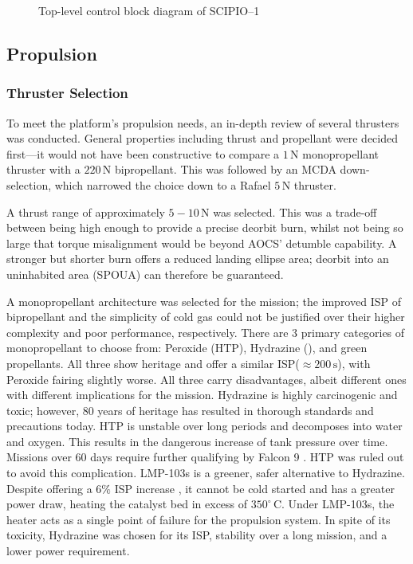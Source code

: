 \documentclass[a4paper, 11pt, conference]{IEEEtran}
\begin{document}
\begin{figure}[H]
    \centering
    \resizebox{0.9\linewidth}{!}{%
    }
    \caption{Top-level control block diagram of SCIPIO–1}
    \label{fig:controlblock}
\end{figure}

\subsection{Propulsion}
\subsubsection{Thruster Selection}
To meet the platform's propulsion needs, an in-depth review of several thrusters was conducted. General properties including thrust and propellant were decided first—it would not have been constructive to compare a $1\,\mathrm{N}$ monopropellant thruster with a $220\,\mathrm{N}$ bipropellant. This was followed by an MCDA down-selection, which narrowed the choice down to a Rafael $5\,\mathrm{N}$ thruster.

A thrust range of approximately $5-10\,\mathrm{N}$ was selected. This was a trade-off between being high enough to provide a precise deorbit burn, whilst not being so large that torque misalignment would be beyond AOCS’ detumble capability. A stronger but shorter burn offers a reduced landing ellipse area; deorbit into an uninhabited area (SPOUA) can therefore be guaranteed.

A monopropellant architecture was selected for the mission; the improved ISP of bipropellant and the simplicity of cold gas could not be justified over their higher complexity and poor performance, respectively. There are 3 primary categories of monopropellant to choose from: Peroxide (HTP), Hydrazine (), and green propellants. All three show heritage and offer a similar ISP($\approx200\,\mathrm{s}$), with Peroxide fairing slightly worse. All three carry disadvantages, albeit different ones with different implications for the mission. Hydrazine is highly carcinogenic and toxic; however, 80 years of heritage has resulted in thorough standards and precautions today. HTP is unstable over long periods and decomposes into water and oxygen. This results in the dangerous increase of tank pressure over time. Missions over 60 days require further qualifying by Falcon 9 \cite{noauthor_falcon9rideshare_2024}. HTP was  ruled out to avoid this complication. LMP-103s is a greener, safer alternative to Hydrazine. Despite offering a $6\%$ ISP increase \cite{ECAPS_LMP103S_2023}, it cannot be cold started and has a greater power draw, heating the catalyst bed in excess of $350^{\circ}\,\mathrm{C}$. Under LMP-103s, the heater acts as a single point of failure for the propulsion system. In spite of its toxicity, Hydrazine was chosen for its ISP, stability over a long mission, and a lower power requirement.
\end{document}
